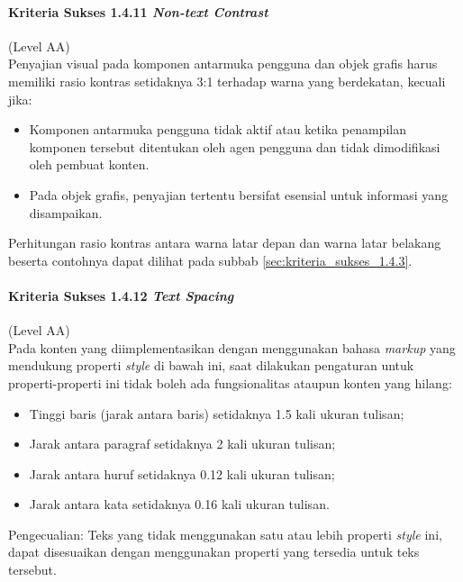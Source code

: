 \paragraph{Kriteria Sukses 1.4.11 \textit{Non-text Contrast}}
\label{sec:kriteria_sukses_1.4.11}
(Level AA)\\

Penyajian visual pada komponen antarmuka pengguna dan objek grafis harus memiliki rasio kontras setidaknya 3:1 terhadap warna yang berdekatan, kecuali jika:

\begin{itemize}
	\item Komponen antarmuka pengguna tidak aktif atau ketika penampilan komponen tersebut ditentukan oleh agen pengguna dan tidak dimodifikasi oleh pembuat konten.
	\item Pada objek grafis, penyajian tertentu bersifat esensial untuk informasi yang disampaikan.
\end{itemize}

Perhitungan rasio kontras antara warna latar depan dan warna latar belakang beserta contohnya dapat dilihat pada subbab \ref{sec:kriteria_sukses_1.4.3}.

\paragraph{Kriteria Sukses 1.4.12 \textit{Text Spacing}}
\label{sec:kriteria_sukses_1.4.12}
(Level AA)\\

Pada konten yang diimplementasikan dengan menggunakan bahasa \textit{markup} yang mendukung properti \textit{style} di bawah ini, saat dilakukan pengaturan untuk properti-properti ini tidak boleh ada fungsionalitas ataupun konten yang hilang:

\begin{itemize}
	\item Tinggi baris (jarak antara baris) setidaknya 1.5 kali ukuran tulisan;
	\item Jarak antara paragraf setidaknya 2 kali ukuran tulisan;
	\item Jarak antara huruf setidaknya 0.12 kali ukuran tulisan;
	\item Jarak antara kata setidaknya 0.16 kali ukuran tulisan.
\end{itemize}

Pengecualian: Teks yang tidak menggunakan satu atau lebih properti \textit{style} ini, dapat disesuaikan dengan menggunakan properti yang tersedia untuk teks tersebut.

